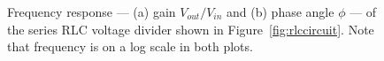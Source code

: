 \documentclass[11pt]{article}
\begin{document}
\begin{figure}[ht]
  \begin{center}
    \hspace{12 pt} 
    \caption{Frequency response --- (a) gain $V_{out}/V_{in}$ and (b)
      phase angle $\phi$ --- of the series RLC voltage divider shown
      in Figure~\ref{fig:rlccircuit}. Note that frequency is on a log
      scale in both plots.}
    \label{fig:rlcvphi}
  \end{center}
\end{figure}
\end{document}
